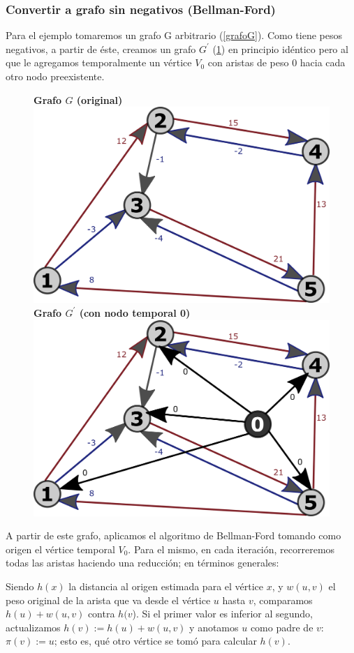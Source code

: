 \documentclass[../tp2_grupo404.tex]{subfiles}
\begin{document}
\subsubsection{Convertir a grafo sin negativos (Bellman-Ford)}\label{sec:parte1_4_1}
Para el ejemplo tomaremos un grafo G arbitrario (\cref{grafoG}).
Como tiene pesos negativos, a partir de éste, creamos un grafo $G^\prime$ (\cref{grafoG_prima})
en principio idéntico pero al que le agregamos temporalmente un
vértice $V_0$ con aristas de peso $0$ hacia cada otro nodo preexistente.

\begin{figure}[H]
    \centering
    \subcaptionbox
        {\label{grafoG}\textbf{Grafo $G$ (original)}}
        {\includegraphics[width=0.4\linewidth,angle=0,origin=c]{out/ford/ford1A.png}}
    \subcaptionbox
        {\label{grafoG_prima}\textbf{Grafo $G^\prime$ (con nodo temporal 0)}}
        {\includegraphics[width=0.4\linewidth,angle=0,origin=c]{out/ford/ford1B.png}}
\end{figure}

A partir de este grafo, aplicamos el algoritmo de Bellman-Ford tomando
como origen el vértice temporal $V_0$. Para el mismo, en cada iteración,
recorreremos todas las aristas haciendo una reducción;
en términos generales:
\begin{displayquote}
Siendo $h(x)$ la distancia al origen estimada para el vértice $x$,
y $w(u,v)$ el peso original de la arista que va desde el vértice $u$ hasta $v$,
comparamos $h(u)+w(u,v)$ contra $h(v$). Si el primer valor es inferior al
segundo, actualizamos $h(v) := h(u)+w(u,v)$ y anotamos $u$ como padre de $v$:
$\pi(v):=u$; esto es, qué otro vértice se tomó para calcular $h(v)$.
\end{displayquote}
\end{document}
